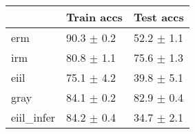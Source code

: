 \begin{tabular}{lll}
\toprule
{} &      Train accs &       Test accs \\
\midrule
erm        &  90.3 $\pm$ 0.2 &  52.2 $\pm$ 1.1 \\
irm        &  80.8 $\pm$ 1.1 &  75.6 $\pm$ 1.3 \\
eiil       &  75.1 $\pm$ 4.2 &  39.8 $\pm$ 5.1 \\
gray       &  84.1 $\pm$ 0.2 &  82.9 $\pm$ 0.4 \\
eiil_infer &  84.2 $\pm$ 0.4 &  34.7 $\pm$ 2.1 \\
\bottomrule
\end{tabular}

